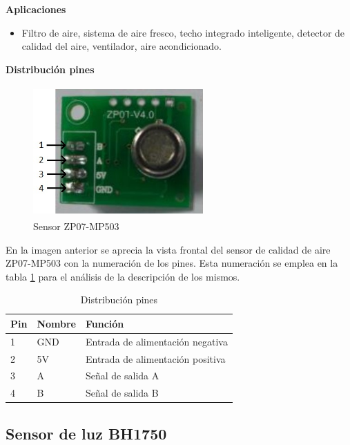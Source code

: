 \textbf{Aplicaciones}
\begin{itemize}
    \item Filtro de aire, sistema de aire fresco, techo integrado inteligente, detector de calidad del aire, ventilador, aire acondicionado.
\end{itemize}

\textbf{Distribución pines}

\begin{figure}[H]
    \centering
    \includegraphics[width=6.5cm, height=5cm]{imagenes/sensor zp07.jpg}
    \caption{Sensor ZP07-MP503}
    \label{imag:ZP07}
\end{figure}

En la imagen anterior se aprecia la vista frontal del sensor de calidad de aire ZP07-MP503 con la numeración de los pines. Esta numeración se emplea en la tabla \ref{tab:pines_ZP07} para el análisis de la descripción de los mismos.

\begin{table}[H]
    \centering
    \caption{Distribución pines}
    \label{tab:pines_ZP07}
    \begin{tabular}{|l|l|l|}
    \hline
    \rowcolor[HTML]{9698ED} 
    Pin & Nombre & Función                          \\ \hline
    1   & GND    & Entrada de alimentación negativa \\ \hline
    2   & 5V     & Entrada de alimentación positiva \\ \hline
    3   & A      & Señal de salida A                \\ \hline
    4   & B      & Señal de salida B                \\ \hline
    \end{tabular}
\end{table}


\subsection{Sensor de luz BH1750}

